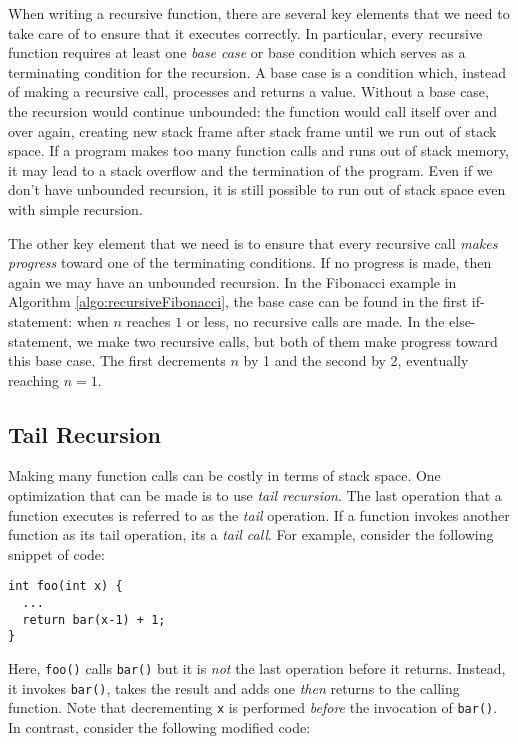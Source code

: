 When writing a recursive function, there are several key elements that
we need to take care of to ensure that it executes correctly.  In particular, 
every recursive function requires at least one \emph{base case} or
base condition which serves as a terminating condition for the recursion.
A base case is a condition which, instead of making a recursive call, 
processes and returns a value.  Without a base case, the recursion would 
continue unbounded: the  function would call itself over and over again, 
creating new stack frame after stack frame until we run out of stack space.  
If a program makes too many function calls and runs out of stack memory, 
it may lead to a \gls{stack overflow} and the 
termination of the program.  Even if we don't have
unbounded recursion, it is still possible to run out of stack space
even with simple recursion.

The other key element that we need is to ensure that every recursive
call \emph{makes progress} toward one of the terminating conditions.  
If no progress is made, then again we may have an unbounded recursion.
In the Fibonacci example in Algorithm \ref{algo:recursiveFibonacci}, the
base case can be found in the first if-statement: when $n$ reaches $1$
or less, no recursive calls are made.  In the else-statement, we make
two recursive calls, but both of them make progress toward this base 
case.  The first decrements $n$ by 1 and the second by 2, eventually
reaching $n = 1$.

\subsection{Tail Recursion}

Making many function calls can be costly in terms of stack space.  One
optimization that can be made is to use \emph{tail recursion}.  The last
operation that a function executes is referred to as the \emph{tail}
operation.  If a function invokes another function as its tail operation, 
its a \emph{tail call}.  For example, consider the following snippet of
code:

\begin{verbatim}
int foo(int x) {
  ...
  return bar(x-1) + 1;
}
\end{verbatim}

Here, \texttt{foo()} calls \texttt{bar()} but it is 
\emph{not} the last operation before it returns.  Instead, it invokes
\texttt{bar()}, takes the result and adds one \emph{then} 
returns to the calling function.  Note that decrementing \texttt{x}
is performed \emph{before} the invocation of \texttt{bar()}.
In contrast, consider the following modified code:

